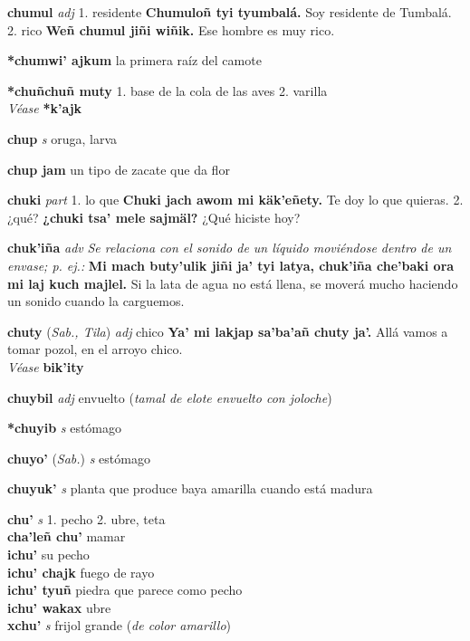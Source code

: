 \documentclass[10pt]{scrbook}
\newcommand{\entry}[1]{\textbf{#1}}
\newcommand{\onedefinition}[1]{#1.}
\newcommand{\nontranslationdef}[1]{\textit{#1}}
\newcommand{\partofspeech}[1]{\textit{#1}}
\newcommand{\spanishtranslation}[1]{#1}
\newcommand{\clarification}[1]{(\textit{#1})}
\newcommand{\cholexample}[1]{\textbf{#1}}
\newcommand{\exampletranslation}[1]{#1}
\newcommand{\alsosee}[1]{\\\textit{Véase} \textbf{#1}}
\newcommand{\relevantdialect}[1]{(\textit{#1})}
\newcommand{\secondaryentry}[1]{\\\textbf{#1}}
\newcommand{\secondpartofspeech}[1]{\textit{#1}}
\newcommand{\secondtranslation}[1]{#1}
\begin{document}
\begin{multicols}{2}
\entry{chumul}
\partofspeech{adj}
\onedefinition{1}
\spanishtranslation{residente}
\cholexample{Chumuloñ tyi tyumbalá.}
\exampletranslation{Soy residente de Tumbalá.}
\onedefinition{2}
\spanishtranslation{rico}
\cholexample{Weñ chumul jiñi wiñik.}
\exampletranslation{Ese hombre es muy rico.}

\entry{*chumwi' ajkum}
\spanishtranslation{la primera raíz del camote}

\entry{*chuñchuñ muty}
\onedefinition{1}
\spanishtranslation{base de la cola de las aves}
\onedefinition{2}
\spanishtranslation{varilla}
\alsosee{*k'ajk}

\entry{chup}
\partofspeech{s}
\spanishtranslation{oruga, larva}

\entry{chup jam}
\spanishtranslation{un tipo de zacate que da flor}

\entry{chuki}
\partofspeech{part}
\onedefinition{1}
\spanishtranslation{lo que}
\cholexample{Chuki jach awom mi käk'eñety.}
\exampletranslation{Te doy lo que quieras.}
\onedefinition{2}
\spanishtranslation{¿qué?}
\cholexample{¿chuki tsa' mele sajmäl?}
\exampletranslation{¿Qué hiciste hoy?}

\entry{chuk'iña}
\partofspeech{adv}
\nontranslationdef{Se relaciona con el sonido de un líquido moviéndose dentro de un envase; p. ej.:}
\cholexample{Mi mach buty'ulik jiñi ja' tyi latya, chuk'iña che'baki ora mi laj kuch majlel.}
\exampletranslation{Si la lata de agua no está llena, se moverá mucho haciendo un sonido cuando la carguemos.}

\entry{chuty}
\relevantdialect{Sab., Tila}
\partofspeech{adj}
\spanishtranslation{chico}
\cholexample{Ya' mi lakjap sa'ba'añ chuty ja'.}
\exampletranslation{Allá vamos a tomar pozol, en el arroyo chico.}
\alsosee{bik'ity}

\entry{chuybil}
\partofspeech{adj}
\spanishtranslation{envuelto}
\clarification{tamal de elote envuelto con joloche}

\entry{*chuyib}
\partofspeech{s}
\spanishtranslation{estómago}

\entry{chuyo'}
\relevantdialect{Sab.}
\partofspeech{s}
\spanishtranslation{estómago}

\entry{chuyuk'}
\partofspeech{s}
\spanishtranslation{planta que produce baya amarilla cuando está madura}

\entry{chu'}
\partofspeech{s}
\onedefinition{1}
\spanishtranslation{pecho}
\onedefinition{2}
\spanishtranslation{ubre, teta}
\secondaryentry{cha'leñ chu'}
\secondtranslation{mamar}
\secondaryentry{ichu'}
\secondtranslation{su pecho}
\secondaryentry{ichu' chajk}
\secondtranslation{fuego de rayo}
\secondaryentry{ichu' tyuñ}
\secondtranslation{piedra que parece como pecho}
\secondaryentry{ichu' wakax}
\secondtranslation{ubre}
\secondaryentry{xchu'}
\secondpartofspeech{s}
\secondtranslation{frijol grande}
\clarification{de color amarillo}


\end{multicols}
\end{document}
